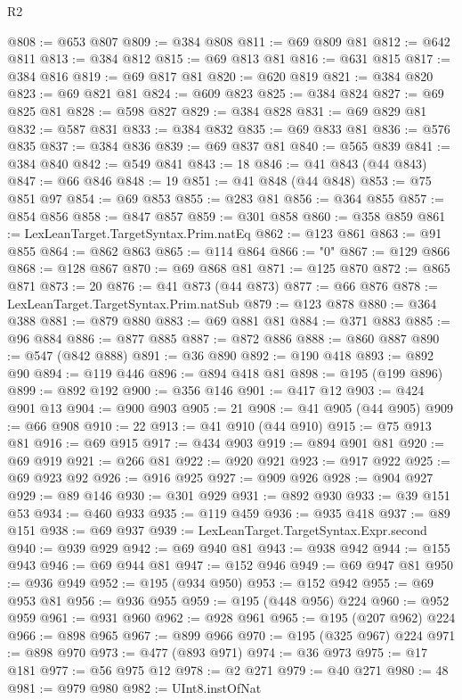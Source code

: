 \begin{lexlean}{R2}
\begin{coremodule}
{{{{{{{{{{{{{{{{{{{{{{{{{{{{{{{{{{{{{{{{{{{{{{@808 := @653 @807
@809 := @384 @808
@811 := @69 @809 @81
@812 := @642 @811
@813 := @384 @812
@815 := @69 @813 @81
@816 := @631 @815
@817 := @384 @816
@819 := @69 @817 @81
@820 := @620 @819
@821 := @384 @820
@823 := @69 @821 @81
@824 := @609 @823
@825 := @384 @824
@827 := @69 @825 @81
@828 := @598 @827
@829 := @384 @828
@831 := @69 @829 @81
@832 := @587 @831
@833 := @384 @832
@835 := @69 @833 @81
@836 := @576 @835
@837 := @384 @836
@839 := @69 @837 @81
@840 := @565 @839
@841 := @384 @840
@842 := @549 @841
@843 := 18
@846 := @41 @843 (@44 @843)
@847 := @66 @846
@848 := 19
@851 := @41 @848 (@44 @848)
@853 := @75 @851 @97
@854 := @69 @853
@855 := @283 @81
@856 := @364 @855
@857 := @854 @856
@858 := @847 @857
@859 := @301 @858
@860 := @358 @859
@861 := LexLeanTarget.TargetSyntax.Prim.natEq
@862 := @123 @861
@863 := @91 @855
@864 := @862 @863
@865 := @114 @864
@866 := "0"
@867 := @129 @866
@868 := @128 @867
@870 := @69 @868 @81
@871 := @125 @870
@872 := @865 @871
@873 := 20
@876 := @41 @873 (@44 @873)
@877 := @66 @876
@878 := LexLeanTarget.TargetSyntax.Prim.natSub
@879 := @123 @878
@880 := @364 @388
@881 := @879 @880
@883 := @69 @881 @81
@884 := @371 @883
@885 := @96 @884
@886 := @877 @885
@887 := @872 @886
@888 := @860 @887
@890 := @547 (@842 @888)
@891 := @36 @890
@892 := @190 @418
@893 := @892 @90
@894 := @119 @446
@896 := @894 @418 @81
@898 := @195 (@199 @896)
@899 := @892 @192
@900 := @356 @146
@901 := @417 @12
@903 := @424 @901 @13
@904 := @900 @903
@905 := 21
@908 := @41 @905 (@44 @905)
@909 := @66 @908
@910 := 22
@913 := @41 @910 (@44 @910)
@915 := @75 @913 @81
@916 := @69 @915
@917 := @434 @903
@919 := @894 @901 @81
@920 := @69 @919
@921 := @266 @81
@922 := @920 @921
@923 := @917 @922
@925 := @69 @923 @92
@926 := @916 @925
@927 := @909 @926
@928 := @904 @927
@929 := @89 @146
@930 := @301 @929
@931 := @892 @930
@933 := @39 @151 @53
@934 := @460 @933
@935 := @119 @459
@936 := @935 @418
@937 := @89 @151
@938 := @69 @937
@939 := LexLeanTarget.TargetSyntax.Expr.second
@940 := @939 @929
@942 := @69 @940 @81
@943 := @938 @942
@944 := @155 @943
@946 := @69 @944 @81
@947 := @152 @946
@949 := @69 @947 @81
@950 := @936 @949
@952 := @195 (@934 @950)
@953 := @152 @942
@955 := @69 @953 @81
@956 := @936 @955
@959 := @195 (@448 @956) @224
@960 := @952 @959
@961 := @931 @960
@962 := @928 @961
@965 := @195 (@207 @962) @224
@966 := @898 @965
@967 := @899 @966
@970 := @195 (@325 @967) @224
@971 := @898 @970
@973 := @477 (@893 @971)
@974 := @36 @973
@975 := @17 @181
@977 := @56 @975 @12
@978 := @2 @271
@979 := @40 @271
@980 := 48
@981 := @979 @980
@982 := UInt8.instOfNat
}}}}}}}}}}}}}}}}}}}}}}}}}}}}}}}}}}}}}}}}}}}}}}
\end{coremodule}
\end{lexlean}
